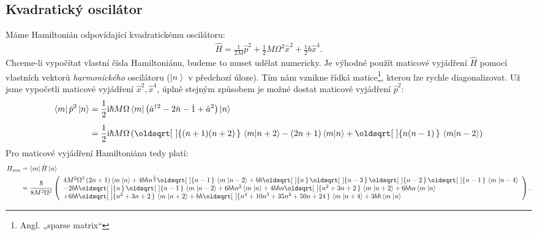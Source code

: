 \documentclass[10pt,a4paper]{article}
\renewcommand*{\sqrt}[2][\ ]{\oldsqrt[#1]{#2\,}\,}
\newcommand{\const}[1]{\text{\rmfamily\upshape #1}}
\newcommand{\bra}[1]{\left< #1 \right|}
\newcommand{\ket}[1]{\left| #1 \right>}
\newcommand{\braket}[2]{\left< #1 \middle| #2 \right>}
\renewcommand{\i}{\const{i}}
\begin{document}
\subsection{Kvadratický oscilátor}
Máme Hamiltonián odpovídající kvadratickému oscilátoru:
\begin{align*}
    \hat{H} = \frac{1}{2M} \hat{p}^2 + \frac{1}{2} M \Omega^2 \hat{x}^2 + \frac{1}{2} b \hat{x}^4.
\end{align*}
Chceme-li vypočítat vlastní čísla Hamiltoniánu, budeme to muset udělat numericky. Je výhodné použít maticové vyjádření $\hat{H}$ pomocí vlastních vektorů \textit{harmonického} oscilátoru ($\ket{n}$ v předchozí úloze). Tím nám vznikne řídká matice\footnote{Angl. „sparse matrix“}, kterou lze rychle diagonalizovat.
Už jsme vypočetli maticové vyjádření $\hat{x}^2, \hat{x}^4$, úplně stejným způsobem je možné dostat maticové vyjádření $\hat{p}^2$:
\begin{align*}
    \bra{m} \hat{p}^2 \ket{n}
    &= \frac{1}{2} \i \hbar M \Omega \bra{m} \left(
        \hat{a}^{\dagger 2} - 2\hat{n} - \hat{1} + \hat{a}^2
    \right) \ket{n}
    \\[5pt]
    &= \frac{1}{2} \i \hbar M \Omega \left(
        \sqrt{(n+1)(n+2)} \braket{m}{n+2}
        -(2n+1)\braket{m}{n}
        +\sqrt{n(n-1)} \braket{m}{n-2}
    \right)
\end{align*}
Pro maticové vyjádření Hamiltoniánu tedy platí:
\begin{align*}
    H_{mn} &= \bra{m} \hat{H} \ket{n} \\
    &= \frac{\hbar}{8 M^{2} \Omega^{2}} \left(
        \begin{array}{l}
            4 M^{2} \Omega^{3} \left(2 n + 1\right) \left\langle m \right. {\left|n\right\rangle } + 4 b \hbar n^{\frac{3}{2}} \sqrt{n - 1} \left\langle m \right. {\left|n - 2\right\rangle } + b \hbar \sqrt{n} \sqrt{n - 3} \sqrt{n - 2} \sqrt{n - 1} \left\langle m \right. {\left|n - 4\right\rangle }
            \\
            - 2 b \hbar \sqrt{n} \sqrt{n - 1} \left\langle m \right. {\left|n - 2\right\rangle } + 6 b \hbar n^{2} \left\langle m \right. {\left|n\right\rangle } + 4 b \hbar n \sqrt{n^{2} + 3 n + 2} \left\langle m \right. {\left|n + 2\right\rangle } + 6 b \hbar n \left\langle m \right. {\left|n\right\rangle }
            \\
            + 6 b \hbar \sqrt{n^{2} + 3 n + 2} \left\langle m \right. {\left|n + 2\right\rangle } + b \hbar \sqrt{n^{4} + 10 n^{3} + 35 n^{2} + 50 n + 24} \left\langle m \right. {\left|n + 4\right\rangle } + 3 b \hbar \left\langle m \right. {\left|n\right\rangle }
        \end{array}
    \right).
\end{align*}
\end{document}
